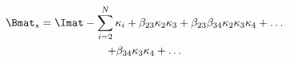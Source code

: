 \begin{multline}
\Bmat_s = \Imat - \sum\limits^{N}_{i=2} \kappa_i + \beta_{23} \kappa_2 \kappa_3 + \beta_{23}\beta_{34} \kappa_2 \kappa_3 \kappa_4+\ldots \\
+\beta_{34} \kappa_3\kappa_4 +\ldots
\end{multline}